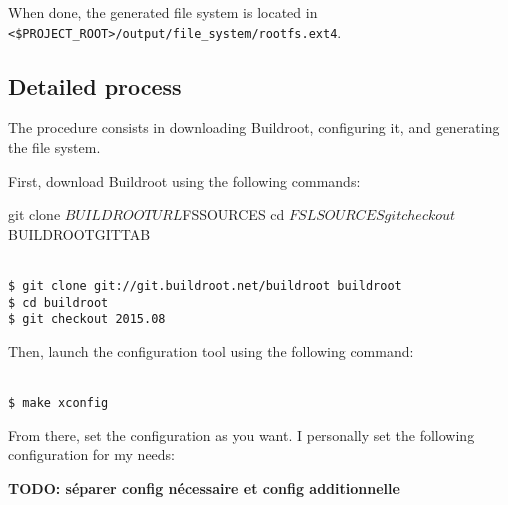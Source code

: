 \documentclass[openany,a4paper]{book}
\begin{document}
When done, the generated file system is located in \nolinkurl{<$PROJECT_ROOT>/output/file_system/rootfs.ext4}.

\subsection{Detailed process}


The procedure consists in downloading Buildroot, configuring it, and generating the file system.

First, download Buildroot using the following commands:

  git clone $BUILDROOTURL $FSSOURCES
  cd $FSLSOURCES
  git checkout $BUILDROOTGITTAB

\begin{tabbing}
\kill \hspace{1cm} \= \\
\> \texttt{\$ git clone git://git.buildroot.net/buildroot buildroot} \\
\> \texttt{\$ cd buildroot} \\
\> \texttt{\$ git checkout 2015.08} \\
\end{tabbing}

Then, launch the configuration tool using the following command:

\begin{tabbing}
\kill \hspace{1cm} \= \\
\> \texttt{\$ make xconfig}\\
\end{tabbing}

From there, set the configuration as you want.
I personally set the following configuration for my needs:

\textbf{TODO: séparer config nécessaire et config additionnelle}
\end{document}
